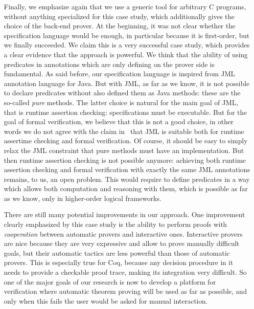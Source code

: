 Finally, we emphasize again that we use a generic tool for arbitrary C
programs, without anything specialized for this case study, which
additionally gives the choice of the back-end prover. At the
beginning, it was not clear whether the \caduceus{} specification
language would be enough, in particular because it is first-order, but
we finally succeeded.  We claim this is a very successful case study,
which provides a clear evidence that the \caduceus{} approach is
powerful. We think that the ability of using predicates in annotations
which are only defining on the prover side is fundamental. As said
before, our specification language is inspired from JML annotation
language for Java. But with JML, as far as we know, it is not possible
to declare predicates without also defined them as Java methods: these
are the so-called \emph{pure} methods. The latter choice is natural
for the main goal of JML, that is runtime assertion checking:
specifications must be executable. But for the goal of formal
verification, we believe that this is not a good choice, in other
words we do not agree with the claim in~\cite{leavens03a} that JML is
suitable both for runtime assertime checking and formal verification.
Of course, it should be easy to simply relax the JML constraint that
pure methods must have an implementation. But then runtime assertion
checking is not possible anymore: achieving both runtime assertion
checking and formal verification with exactly the same JML annotations
remains, to us, an open problem. This would require to define
predicates in a way which allows both computation and reasoning with
them, which is possible as far as we know, only in higher-order
logical frameworks.

There are still many potential improvements in our approach. One
improvement clearly emphasized by this case study is the ability to
perform proofs with \emph{cooperation} between automatic provers and
interactive ones. Interactive provers are nice because they are very
expressive and allow to prove manually difficult goals, but their
automatic tactics are less powerful than those of automatic provers. This is
especially true for Coq, because any decision procedure in it needs to
provide a checkable proof trace, making its integration very
difficult. So one of the major goals of our research is now to develop
a platform for verification where automatic theorem proving will be
used as far as possible, and only when this fails the user would be asked
for manual interaction.

